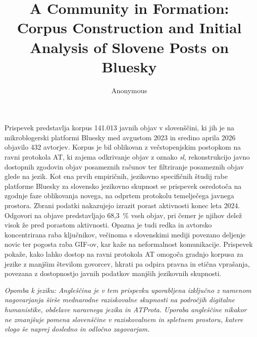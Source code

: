\documentclass{article}
\title{A Community in Formation: Corpus Construction and Initial Analysis of Slovene Posts on Bluesky}
\author{
  Anonymous
}
\begin{document}
\maketitle

\begin{abstract}

\end{abstract}












\printbibliography

\newpage
{}
\begin{abstracteng}
Prispevek predstavlja korpus 141.013 javnih objav v slovenščini, ki jih je na mikroblogerski platformi Bluesky med avgustom 2023 in sredino aprila 2026 objavilo 432 avtorjev. Korpus je bil oblikovan z večstopenjskim postopkom na ravni protokola AT, ki zajema odkrivanje objav z oznako \textit{sl}, rekonstrukcijo javno dostopnih zgodovin objav posameznih računov ter filtriranje posameznih objav glede na jezik. Kot ena prvih empiričnih, jezikovno specifičnih študij rabe platforme Bluesky za slovensko jezikovno skupnost se prispevek osredotoča na zgodnje faze oblikovanja novega, na odprtem protokolu temelječega javnega prostora. Zbrani podatki nakazujejo izrazit porast aktivnosti konec leta 2024. Odgovori na objave predstavljajo 68,3~\% vseh objav, pri čemer je njihov delež visok že pred porastom aktivnosti. Opazna je tudi redka in avtorsko koncentrirana raba ključnikov, večinoma s slovenskimi mediji povezano deljenje novic ter pogosta raba GIF-ov, kar kaže na neformalnost komunikacije. Prispevek pokaže, kako lahko dostop na ravni protokola AT omogoča gradnjo korpusa za jezike z manjšim številom govorcev, hkrati pa odpira pravna in etična vprašanja, povezana z dostopnostjo javnih podatkov manjših jezikovnih skupnosti.

\textit{Opomba k jeziku: Angleščina je v tem prispevku uporabljena izključno z namenom nagovarjanja širše mednarodne raziskovalne skupnosti na področjih digitalne humanistike, obdelave naravnega jezika in ATProta. Uporaba angleščine nikakor ne zmanjšuje pomena slovenščine v raziskovalnem in spletnem prostoru, katere vlogo še naprej dosledno in odločno zagovarjam.}
\end{abstracteng}
\end{document}
